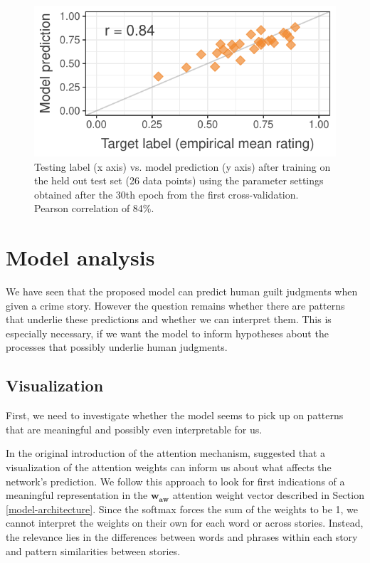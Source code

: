 \documentclass[11pt,a4paper]{article}
\begin{document}
\begin{figure}
	\includegraphics[width=\linewidth]{graphs/test-corr.pdf}
	\caption{Testing label (x axis) vs. model prediction (y axis) after training on the held out test set (26 data points) using the parameter settings obtained after the 30th epoch from the first cross-validation. Pearson correlation of 84\%.}
	\label{fig:test-corr}
\end{figure}

\section{Model analysis}

We have seen that the proposed model can predict human guilt judgments when given a crime story. However the question remains whether there are patterns that underlie these predictions and whether we can interpret them. This is especially necessary, if we want the model to inform hypotheses about the processes that possibly underlie human judgments.

\subsection{Visualization}

First, we need to investigate whether the model seems to pick up on patterns that are meaningful and possibly even interpretable for us.

In the original introduction of the attention mechanism, \citeauthor{Vaswani:2017} suggested that a visualization of the attention weights can inform us about what affects the network's prediction. We follow this approach to look for first indications of a meaningful representation in the $\mathbf{w_{aw}}$ attention weight vector described in Section \ref{model-architecture}. Since the softmax forces the sum of the weights to be 1, we cannot interpret the weights on their own for each word or across stories. Instead, the relevance lies in the differences between words and phrases within each story and pattern similarities between stories.
\end{document}
